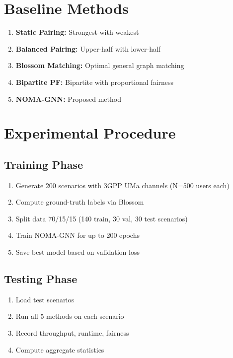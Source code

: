 \section{Baseline Methods}

\begin{enumerate}
    \item \textbf{Static Pairing:} Strongest-with-weakest
    \item \textbf{Balanced Pairing:} Upper-half with lower-half
    \item \textbf{Blossom Matching:} Optimal general graph matching
    \item \textbf{Bipartite PF:} Bipartite with proportional fairness
    \item \textbf{NOMA-GNN:} Proposed method
\end{enumerate}

\section{Experimental Procedure}

\subsection{Training Phase}
\begin{enumerate}
    \item Generate 200 scenarios with 3GPP UMa channels (N=500 users each)
    \item Compute ground-truth labels via Blossom
    \item Split data 70/15/15 (140 train, 30 val, 30 test scenarios)
    \item Train NOMA-GNN for up to 200 epochs
    \item Save best model based on validation loss
\end{enumerate}

\subsection{Testing Phase}
\begin{enumerate}
    \item Load test scenarios
    \item Run all 5 methods on each scenario
    \item Record throughput, runtime, fairness
    \item Compute aggregate statistics
\end{enumerate}

